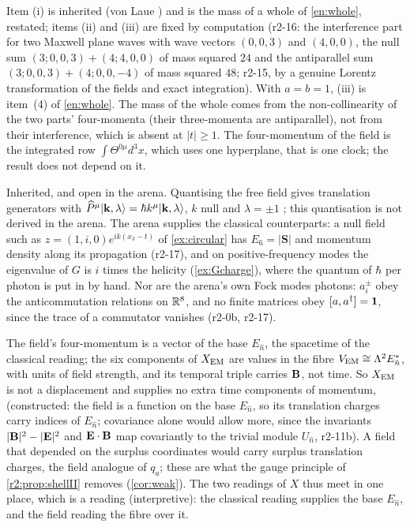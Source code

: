 Item (i) is inherited (von Laue \cite{Laue1911}) and is the mass of a whole of \cref{en:whole}, restated; items (ii) and (iii) are fixed by
computation (r2-16: the interference part for two Maxwell plane waves with wave vectors $(0,0,3)$ and $(4,0,0)$, the null sum $(3;0,0,3)+(4;4,0,0)$ of
mass squared $24$ and the antiparallel sum $(3;0,0,3)+(4;0,0,-4)$ of mass squared $48$; r2-15, by a genuine Lorentz transformation of the fields and exact integration). With $a=b=1$, (iii) is item~(4) of \cref{en:whole}. The mass of the whole comes from the non-collinearity of the two parts' four-momenta (their three-momenta are antiparallel), not from their
interference, which is absent at $|t|\ge1$. The four-momentum
of the field is the integrated row $\int\Theta^{0\mu}d^3x$, which uses one hyperplane, that is one clock; the result does not depend on it.

\begin{remark}
\label{r2:rem:photon}
Inherited, and open in the arena. Quantising the free field gives translation generators with $\widehat P^\mu|\mathbf k,\lambda\rangle=\hbar k^\mu|\mathbf k,\lambda\rangle$,
$k$ null and $\lambda=\pm1$ \cite{Wigner39,WeinbergQFT}; this quantisation is not derived in the arena. The arena supplies the classical counterparts: a null field such as $z=(1,i,0)e^{ik(x_3-t)}$ of \cref{ex:circular} has $E_6=|\mathbf S|$
and momentum density along its propagation (r2-17), and on positive-frequency modes the eigenvalue of $G$ is $i$ times the helicity (\cref{ex:Gcharge}), where the quantum of $\hbar$ per photon is put in by hand. Nor are the arena's own Fock modes photons: $a^\pm_i$ obey the anticommutation
relations on $\mathbb{R}^8$, and no finite matrices obey $[a,a^\dagger]=\mathbf 1$, since the trace of a commutator vanishes (r2-0b, r2-17).
\end{remark}

\begin{remark}
\label{r2:rem:base}
The field's four-momentum is a vector of the base $E_{\hat n}$, the spacetime of the classical reading; the six components of $X_{\rm EM}$ are values in the fibre
$V_{\rm EM}\cong\Lambda^2E_{\hat n}^*$, with units of field strength, and its temporal triple carries $\mathbf B$, not time. So $X_{\rm EM}$ is not a displacement and supplies
no extra time components of momentum, (constructed: the field is a function on the base $E_{\hat n}$, so its translation
charges carry indices of $E_{\hat n}$; covariance alone would allow more, since the invariants $|\mathbf B|^2-|\mathbf E|^2$ and $\mathbf E\cdot\mathbf B$ map covariantly to the
trivial module $U_{\hat n}$, r2-11b). A field that depended on the surplus coordinates would carry surplus
translation charges, the field analogue of $q_a$; these are what the gauge principle of \cref{r2:prop:shellII} removes (\cref{cor:weak}). The two
readings of $X$ thus meet in one place, which is a reading (interpretive): the classical reading supplies the base $E_{\hat n}$, and the field
reading the fibre over it.
\end{remark}

